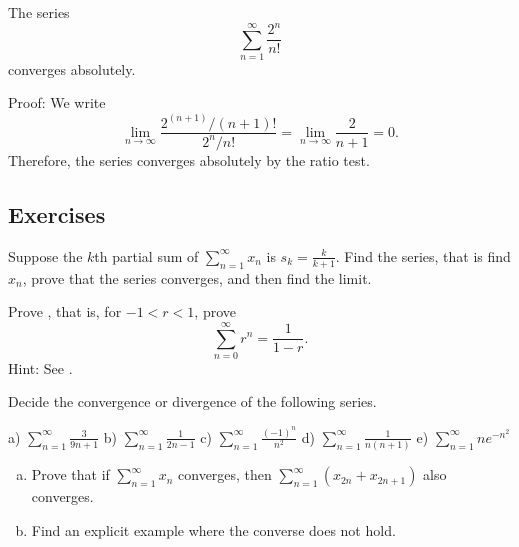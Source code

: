 \begin{example}
The series
\begin{equation*}
\sum_{n=1}^\infty \frac{2^n}{n!}
\end{equation*}
converges absolutely.

Proof:  We write
\begin{equation*}
\lim_{n\to\infty} \frac{2^{(n+1)}/(n+1)!}{2^n / n!} =
\lim_{n\to\infty} \frac{2}{n+1} = 0 .
\end{equation*}
Therefore, the series converges absolutely by the ratio test.
\end{example}

\subsection{Exercises}

\begin{exercise}
Suppose the $k$th partial sum of $\displaystyle \sum_{n=1}^\infty x_n$ is $s_k = \frac{k}{k+1}$.
Find the series, that is find $x_n$, prove that the series converges, and
then find the limit.
\end{exercise}

\begin{exercise} \label{geometric:exr}
Prove , that is, for $-1 < r < 1$, prove
\begin{equation*}
\sum_{n=0}^\infty r^n = \frac{1}{1-r} .
\end{equation*}
Hint:  See .
\end{exercise}

\begin{exercise}
Decide the convergence or divergence of the following series.

\medskip

\noindent
a)
$\displaystyle \sum_{n=1}^\infty \frac{3}{9n+1}$
\qquad
b)
$\displaystyle \sum_{n=1}^\infty \frac{1}{2n-1}$
\qquad
c)
$\displaystyle \sum_{n=1}^\infty \frac{{(-1)}^n}{n^2}$
\qquad
d)
$\displaystyle \sum_{n=1}^\infty \frac{1}{n(n+1)}$
\qquad
e)
$\displaystyle \sum_{n=1}^\infty n e^{-n^2}$
\end{exercise}

\begin{samepage}
\begin{exercise}
\leavevmode
\begin{enumerate}[a)]
\item Prove that if
$\displaystyle
\sum_{n=1}^\infty x_n
$
converges, then
$\displaystyle
\sum_{n=1}^\infty ( x_{2n} + x_{2n+1} )
$
also converges.
\item
Find an explicit example where the converse does not hold.
\end{enumerate}
\end{exercise}
\end{samepage}

